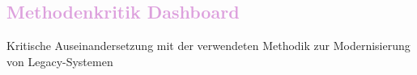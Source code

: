 \subsection{\textcolor{Plum}{Methodenkritik Dashboard}}
Kritische Auseinandersetzung mit der verwendeten Methodik zur Modernisierung von Legacy-Systemen